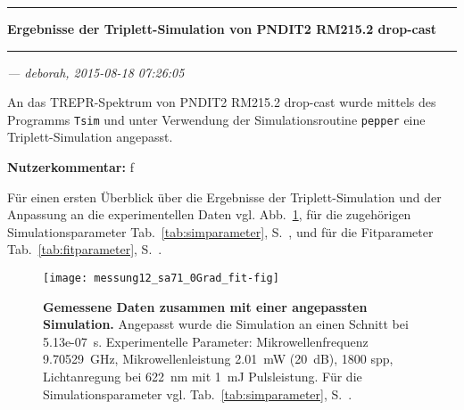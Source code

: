 \documentclass{article}
\begin{document}
\thispagestyle{empty}

\vspace*{-1.5cm}

\noindent\rule[1.5ex]{\textwidth}{1pt}

\begin{sffamily}\bfseries\large
Ergebnisse der Triplett-Simulation von PNDIT2 RM215.2 drop-cast
\end{sffamily}

\noindent\rule{\textwidth}{1pt}

\begin{flushright}\slshape
--- deborah, 2015-08-18 07:26:05
\end{flushright}

\vspace*{1.5em}

An das TREPR-Spektrum von PNDIT2 RM215.2 drop-cast wurde mittels des Programms \texttt{Tsim} und unter Verwendung der Simulationsroutine \texttt{pepper} eine Triplett-Simulation angepasst.


\textbf{Nutzerkommentar:} f


Für einen ersten Überblick über die Ergebnisse der Triplett-Simulation und der Anpassung an die experimentellen Daten vgl. Abb.~\ref{fig:ergebnisse}, für die zugehörigen Simulationsparameter Tab.~\ref{tab:simparameter}, S.~\pageref{tab:simparameter}, und für die Fitparameter Tab.~\ref{tab:fitparameter}, S.~\pageref{tab:fitparameter}.


\begin{figure}[h]
\centering

\texttt{[image: messung12\_sa71\_0Grad\_fit-fig]}

\caption{\textbf{Gemessene Daten zusammen mit einer angepassten Simulation.} Angepasst wurde die Simulation an einen Schnitt bei 5.13e-07~s. Experimentelle Parameter: Mikrowellenfrequenz  9.70529~GHz, Mikrowellenleistung  2.01~mW (20~dB), 1800 spp, Lichtanregung bei 622~nm mit   1~mJ Pulsleistung. Für die Simulationsparameter vgl. Tab.~\ref{tab:simparameter}, S.~\pageref{tab:simparameter}.}
\label{fig:ergebnisse}
\end{figure}

\begin{center}
\setlength{\fboxsep}{1.5ex}\setlength{\fboxrule}{.75pt}
\end{center}
\end{document}
